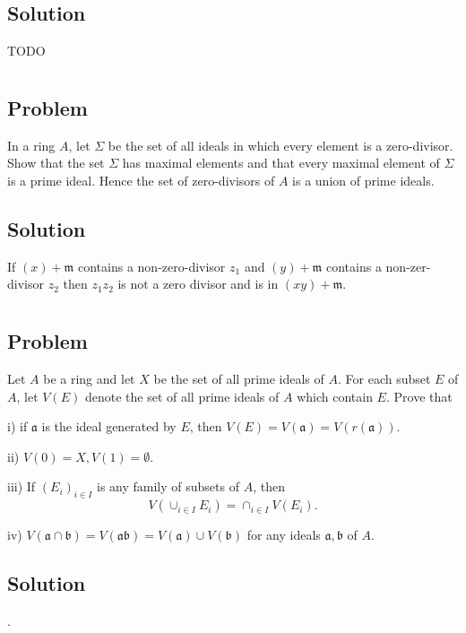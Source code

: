 \documentclass[book,12pt,oneside,openany]{memoir}
\begin{document}
\subsection{Solution}
TODO


\section{}
\subsection{Problem}
In a ring $A$, let $\Sigma$ be the set of all ideals in which every element is a zero-divisor. Show that the set $\Sigma$ has maximal elements and that every maximal element of $\Sigma$ is a prime ideal. Hence the set of zero-divisors of $A$ is a union of prime ideals.
\subsection{Solution}

If $(x)+\mathfrak m$ contains a non-zero-divisor $z_1$ and
$(y)+\mathfrak m$ contains a non-zer-divisor $z_2$ then
$z_1 z_2$ is not a zero divisor and is in $(xy)+\mathfrak m$.

\section{}
\subsection{Problem}
Let $A$ be a ring and let $X$ be the set of all prime ideals of $A$. For each subset $E$ of $A$, let $V(E)$ denote the set of all prime ideals of $A$ which contain $E$. Prove that

i) if $\mathfrak{a}$ is the ideal generated by $E$, then $V(E) = V(\mathfrak{a}) = V(r(\mathfrak{a}))$.

ii) $V(0) = X, V(1) = \emptyset$.

iii) If $(E_i)_{i \in I}$ is any family of subsets of $A$, then \[V (\cup_{i \in I} E_i ) = \cap_{i \in I} V(E_i).\]

iv) $V(\mathfrak{a} \cap \mathfrak{b}) = V(\mathfrak{a}\mathfrak{b}) = V(\mathfrak{a}) \cup V(\mathfrak{b})$ for any ideals $\mathfrak{a}, \mathfrak{b}$ of $A$.

\subsection{Solution}
.
\end{document}
